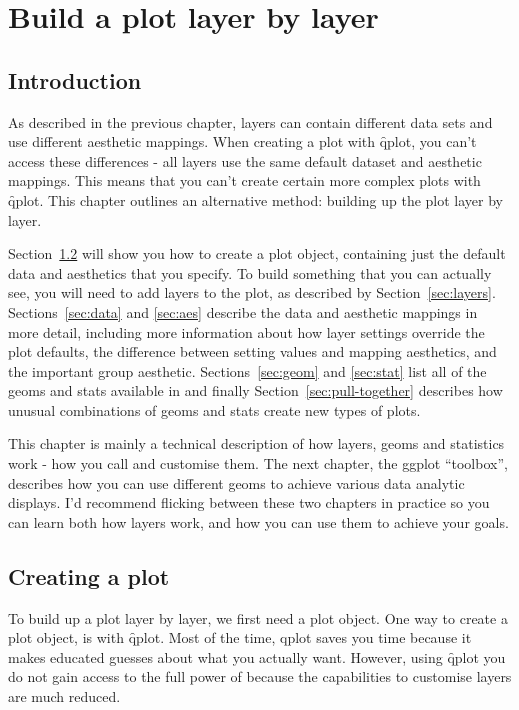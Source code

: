 

\chapter{Build a plot layer by layer}
\label{cha:layers}

\section{Introduction}

As described in the previous chapter, layers can contain different data sets and use different aesthetic mappings.  When creating a plot with \f{qplot}, you can't access these differences - all layers use the same default dataset and aesthetic mappings.  This means that you can't create certain more complex plots with {\f qplot}.  This chapter outlines an alternative method: building up the plot layer by layer.  

Section~\ref{sec:ggplot} will show you how to create a plot object, containing just the default data and aesthetics that you specify.  To build something that you can actually see, you will need to add layers to the plot, as described by Section~\ref{sec:layers}.  Sections~\ref{sec:data} and \ref{sec:aes} describe the data and aesthetic mappings in more detail, including more information about how layer settings override the plot defaults, the difference between setting values and mapping aesthetics, and the important group aesthetic.  Sections~\ref{sec:geom} and \ref{sec:stat} list all of the geoms and stats available in \ggplot and finally Section~\ref{sec:pull-together} describes how unusual combinations of geoms and stats create new types of plots.

This chapter is mainly a technical description of how layers, geoms and statistics work - how you call and customise them.  The next chapter, the ggplot ``toolbox'', describes how you can use different geoms to achieve various data analytic displays.  I'd recommend flicking between these two chapters in practice so you can learn both how layers work, and how you can use them to achieve your goals.

\section{Creating a plot}
\label{sec:ggplot}

To build up a plot layer by layer, we first need a plot object.  One way to create a plot object, is with \f{qplot}.  Most of the time, qplot saves you time because it makes educated guesses about what you actually want.  However, using \f{qplot} you do not gain access to the full power of \ggplot because the capabilities to customise layers are much reduced.

